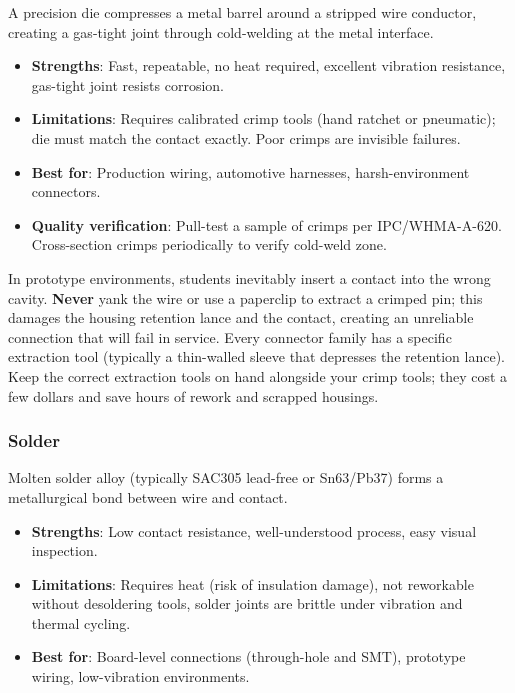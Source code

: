\documentclass[11pt,letterpaper,twoside,openany]{book}
\begin{document}
A precision die compresses a metal barrel around a stripped wire conductor, creating a gas-tight joint through cold-welding at the metal interface.

\begin{itemize}[nosep,leftmargin=1.5em]
  \item \textbf{Strengths}: Fast, repeatable, no heat required, excellent vibration resistance, gas-tight joint resists corrosion.
  \item \textbf{Limitations}: Requires calibrated crimp tools (hand ratchet or pneumatic); die must match the contact exactly. Poor crimps are invisible failures.
  \item \textbf{Best for}: Production wiring, automotive harnesses, harsh-environment connectors.
  \item \textbf{Quality verification}: Pull-test a sample of crimps per IPC/WHMA-A-620. Cross-section crimps periodically to verify cold-weld zone.
\end{itemize}

\begin{warningbox}
In prototype environments, students inevitably insert a contact into the wrong cavity. \textbf{Never} yank the wire or use a paperclip to extract a crimped pin; this damages the housing retention lance and the contact, creating an unreliable connection that will fail in service. Every connector family has a specific extraction tool (typically a thin-walled sleeve that depresses the retention lance). Keep the correct extraction tools on hand alongside your crimp tools; they cost a few dollars and save hours of rework and scrapped housings.
\end{warningbox}

\subsubsection{Solder}

Molten solder alloy (typically SAC305 lead-free or Sn63/Pb37) forms a metallurgical bond between wire and contact.

\begin{itemize}[nosep,leftmargin=1.5em]
  \item \textbf{Strengths}: Low contact resistance, well-understood process, easy visual inspection.
  \item \textbf{Limitations}: Requires heat (risk of insulation damage), not reworkable without desoldering tools, solder joints are brittle under vibration and thermal cycling.
  \item \textbf{Best for}: Board-level connections (through-hole and SMT), prototype wiring, low-vibration environments.
\end{itemize}
\end{document}
